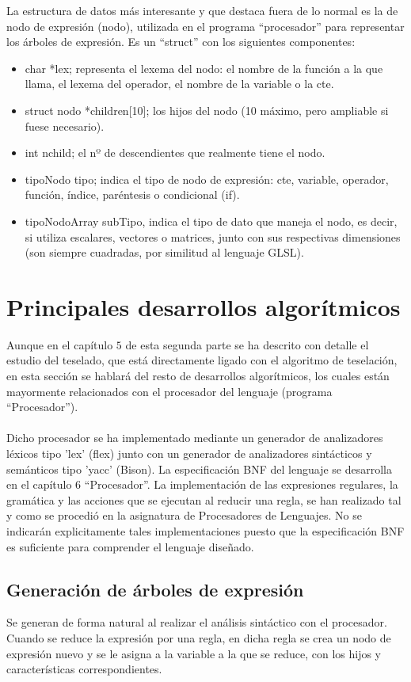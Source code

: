 La estructura de datos más interesante y que destaca fuera de lo normal es la de nodo de expresión (nodo), utilizada en el programa ``procesador'' para representar los árboles de expresión. Es un ``struct'' con los siguientes componentes:
\begin{itemize}
	\item char *lex; representa el lexema del nodo: el nombre de la función a la que llama, el lexema del operador, el nombre de la variable o la cte.
	\item struct nodo *children[10]; los hijos del nodo (10 máximo, pero ampliable si fuese necesario).
	\item int nchild; el nº de descendientes que realmente tiene el nodo.
	\item tipoNodo tipo; indica el tipo de nodo de expresión: cte, variable, operador, función, índice, paréntesis o condicional (if).
	\item tipoNodoArray subTipo, indica el tipo de dato que maneja el nodo, es decir, si utiliza escalares, vectores o matrices, junto con sus respectivas dimensiones (son siempre cuadradas, por similitud al lenguaje GLSL).
\end{itemize}

\section{Principales desarrollos algorítmicos}

Aunque en el capítulo $5$ de esta segunda parte se ha descrito con detalle el estudio del teselado, que está directamente ligado con el algoritmo de teselación, en esta sección se hablará del resto de desarrollos algorítmicos, los cuales están mayormente relacionados con el procesador del lenguaje (programa ``Procesador'').\\
\\Dicho procesador se ha implementado mediante un generador de analizadores léxicos tipo 'lex' (flex) junto con un generador de analizadores sintácticos y semánticos tipo 'yacc' (Bison). La especificación BNF del lenguaje se desarrolla en el capítulo $6$ ``Procesador''. La implementación de las expresiones regulares, la gramática y las acciones que se ejecutan al reducir una regla, se han realizado tal y como se procedió en la asignatura de Procesadores de Lenguajes. No se indicarán explicitamente tales implementaciones puesto que la especificación BNF es suficiente para comprender el lenguaje diseñado.

\subsection*{Generación de árboles de expresión}
Se generan de forma natural al realizar el análisis sintáctico con el procesador. Cuando se reduce la expresión por una regla, en dicha regla se crea un nodo de expresión nuevo y se le asigna a la variable a la que se reduce, con los hijos y características correspondientes.

